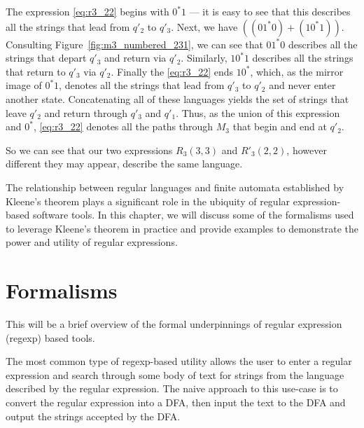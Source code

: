 \documentclass{bcthesis}
\renewcommand{\meo}[1]{}
\begin{document}
		The expression \ref{eq:r3_22} begins with $0^*1$ --- it is easy to see that this describes all the strings that lead from $q'_2$ to $q'_3$.
		Next, we have $((01^*0) + (10^*1))$. 
		Consulting Figure~\ref{fig:m3_numbered_231}, we can see that $01^*0$ describes all the strings that depart $q'_3$ and return via $q'_2$.
		Similarly, $10^*1$ describes all the strings that return to $q'_3$ via $q'_2$.
		Finally the \ref{eq:r3_22} ends $10^*$, which, as the mirror image of $0^*1$, denotes all the strings that lead from $q'_3$ to $q'_2$ and never enter another state.
		Concatenating all of these languages yields the set of strings that leave $q'_2$ and return through $q'_3$ and $q'_1$.
		Thus, as the union of this expression and $0^*$, \ref{eq:r3_22} denotes all the paths through $M_3$ that begin and end at $q'_2$.

		So we can see that our two expressions $R_3(3,3)$ and $R'_3(2, 2)$, however different they may appear, describe the same language.


	\meo{
		Figure out if there are any other parts of the proof that deserve an example to help explain them.
		I will probably include pictures for regular language $\iff$ representable in the initial proof.
		It would be nice to include a power set construction, but it would also end up being pretty long.
	}



\label{sec:motivation}

	The relationship between regular languages and finite automata established by Kleene's theorem plays a significant role in the ubiquity of regular expression-based software tools. 
	In this chapter, we will discuss some of the formalisms used to leverage Kleene's theorem in practice and provide examples to demonstrate the power and utility of regular expressions.

	\section{Formalisms} %
	\label{sec:formalisms}
		This will be a brief overview of the formal underpinnings of regular expression (regexp) based tools.

		The most common type of regexp-based utility allows the user to enter a regular expression and search through some body of text for strings from the language described by the regular expression.
		The naive approach to this use-case is to convert the regular expression into a DFA, then input the text to the DFA and output the strings accepted by the DFA.
		
\end{document}
